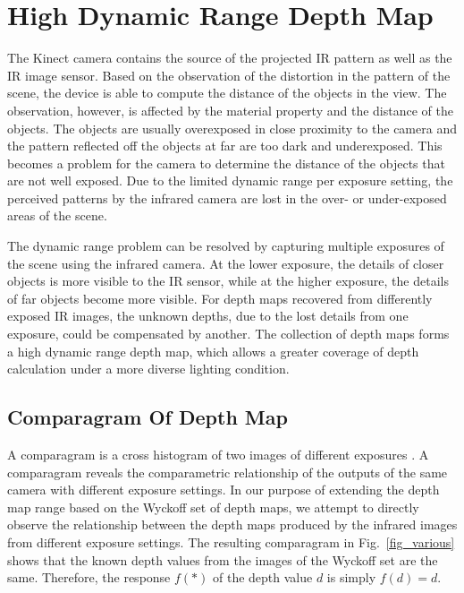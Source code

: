 \section{High Dynamic Range Depth Map}
\label{sec_hdr_depth_map}
The Kinect camera contains the source of the projected IR pattern as well as the IR image sensor. Based on the observation of the distortion in the pattern of the scene, the device is able to compute the distance of the objects in the view. The observation, however, is affected by the material property and the distance of the objects. The objects are usually overexposed in close proximity to the camera and the pattern reflected off the objects at far are too dark and underexposed. This becomes a problem for the camera to determine the distance of the objects that are not well exposed. Due to the limited dynamic range per exposure setting, the perceived patterns by the infrared camera are lost in the over- or under-exposed areas of the scene.

The dynamic range problem can be resolved by capturing multiple exposures of the scene using the infrared camera. At the lower exposure, the details of closer objects is more visible to the IR sensor, while at the higher exposure, the details of far objects become more visible. For depth maps recovered from differently exposed IR images, the unknown depths, due to the lost details from one exposure, could be compensated by another. The collection of depth maps forms a high dynamic range depth map, which allows a greater coverage of depth calculation under a more diverse lighting condition.
\subsection{Comparagram Of Depth Map}

A comparagram is a cross histogram of two images of different exposures \cite{mannwyckofftr}. A comparagram reveals the comparametric relationship of the outputs of the same camera with different exposure settings. In our purpose of extending the depth map range based on the Wyckoff set of depth maps, we attempt to directly observe the relationship between the depth maps produced by the infrared images from different exposure settings. The resulting comparagram in Fig.~\ref{fig_various} shows that the known depth values from the images of the Wyckoff set are the same. Therefore, the response $f(*)$ of the depth value $d$ is simply $f(d) = d$.
